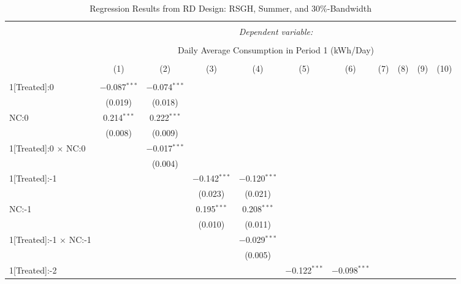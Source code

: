 \begin{table}[!htbp]
\centering 
\caption{Regression Results from RD Design: RSGH, Summer, and 30\%-Bandwidth} 
\label{} 
\footnotesize
\begin{adjustbox}{scale = 0.75}
\begin{tabular}{@{\extracolsep{5pt}}lcccccccccc} 
\\[-1.8ex]\hline 
\hline \\[-1.8ex] 
 & \multicolumn{10}{c}{\textit{Dependent variable:}} \\ 
\cline{2-11} 
\\[-1.8ex] & \multicolumn{10}{c}{Daily Average Consumption in Period 1 (kWh/Day)} \\ 
\\[-1.8ex] & (1) & (2) & (3) & (4) & (5) & (6) & (7) & (8) & (9) & (10)\\ 
\hline \\[-1.8ex] 
 1[Treated]:0 & $-$0.087$^{***}$ & $-$0.074$^{***}$ &  &  &  &  &  &  &  &  \\ 
  & (0.019) & (0.018) &  &  &  &  &  &  &  &  \\ 
 NC:0 & 0.214$^{***}$ & 0.222$^{***}$ &  &  &  &  &  &  &  &  \\ 
  & (0.008) & (0.009) &  &  &  &  &  &  &  &  \\ 
 1[Treated]:0 $\times$ NC:0 &  & $-$0.017$^{***}$ &  &  &  &  &  &  &  &  \\ 
  &  & (0.004) &  &  &  &  &  &  &  &  \\ 
 1[Treated]:-1 &  &  & $-$0.142$^{***}$ & $-$0.120$^{***}$ &  &  &  &  &  &  \\ 
  &  &  & (0.023) & (0.021) &  &  &  &  &  &  \\ 
 NC:-1 &  &  & 0.195$^{***}$ & 0.208$^{***}$ &  &  &  &  &  &  \\ 
  &  &  & (0.010) & (0.011) &  &  &  &  &  &  \\ 
 1[Treated]:-1 $\times$ NC:-1 &  &  &  & $-$0.029$^{***}$ &  &  &  &  &  &  \\ 
  &  &  &  & (0.005) &  &  &  &  &  &  \\ 
 1[Treated]:-2 &  &  &  &  & $-$0.122$^{***}$ & $-$0.098$^{***}$ &  &  &  &  \\ 

\end{tabular}
\end{adjustbox}
\end{table}
